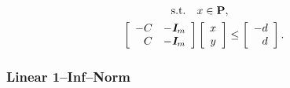 \documentclass{article}
\begin{document}
    \begin{align*}
        \st\quad &x\in\poly,
        \\
        \left[\begin{array}{lll}
                -C
            &
                -\eye_m
            \\
                \minus C
            &
                -\eye_m
        \end{array}\right]
        &
        \left[\begin{array}{c}
            x   \\
            y
        \end{array}\right]
        \leq
        \left[\begin{array}{l}
            -d                \\
            \minus d
        \end{array}\right].
    \end{align*}

\subsubsection{Linear 1--Inf--Norm}
\end{document}
